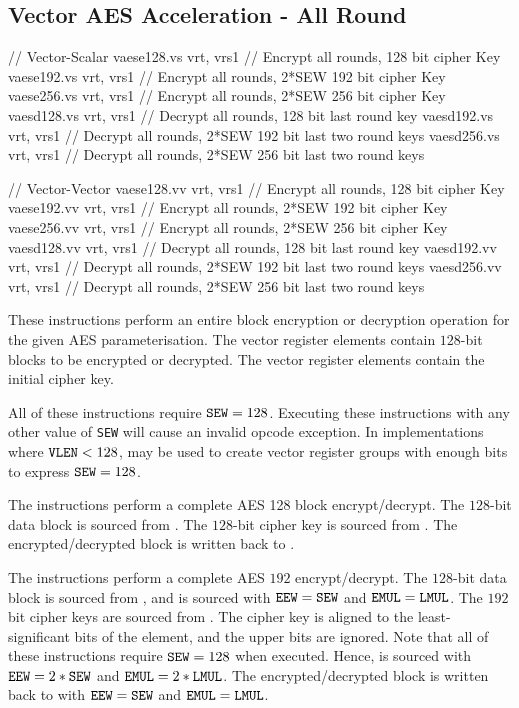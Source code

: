 \subsection{Vector AES Acceleration - All Round}
\label{sec:vector:aes:all-round}

\begin{cryptoisa}
// Vector-Scalar
vaese128.vs vrt, vrs1 // Encrypt all rounds,       128 bit cipher Key
vaese192.vs vrt, vrs1 // Encrypt all rounds, 2*SEW 192 bit cipher Key
vaese256.vs vrt, vrs1 // Encrypt all rounds, 2*SEW 256 bit cipher Key
vaesd128.vs vrt, vrs1 // Decrypt all rounds,       128 bit last     round key
vaesd192.vs vrt, vrs1 // Decrypt all rounds, 2*SEW 192 bit last two round keys
vaesd256.vs vrt, vrs1 // Decrypt all rounds, 2*SEW 256 bit last two round keys

// Vector-Vector
vaese128.vv vrt, vrs1 // Encrypt all rounds,       128 bit cipher Key
vaese192.vv vrt, vrs1 // Encrypt all rounds, 2*SEW 192 bit cipher Key
vaese256.vv vrt, vrs1 // Encrypt all rounds, 2*SEW 256 bit cipher Key
vaesd128.vv vrt, vrs1 // Decrypt all rounds,       128 bit last     round key
vaesd192.vv vrt, vrs1 // Decrypt all rounds, 2*SEW 192 bit last two round keys
vaesd256.vv vrt, vrs1 // Decrypt all rounds, 2*SEW 256 bit last two round keys
\end{cryptoisa}

These instructions perform an entire block encryption or decryption
operation for the given AES parameterisation.
The \vrt vector register elements contain $128$-bit blocks
to be encrypted or decrypted.
The  vector register elements contain the initial
cipher key.

All of these instructions require ${\tt SEW}=128$.
Executing these instructions with any other value of {\tt SEW} will cause
an invalid opcode exception.
In implementations where ${\tt VLEN}<128$, \LMUL may be used to create
vector register groups with enough bits to express ${\tt SEW}=128$.

The  instructions perform a complete AES
128 block encrypt/decrypt.
The $128$-bit data block is sourced from \vrt.
The $128$-bit cipher key is sourced from .
The encrypted/decrypted block is written back to \vrt.

The  instructions perform a complete
AES $192$ encrypt/decrypt.
The $128$-bit data block is sourced from \vrt, and is sourced with
${\tt EEW}={\tt SEW}$ and ${\tt EMUL}={\tt LMUL}$.
The $192$ bit cipher keys are sourced from .
The cipher key is aligned to the least-significant
bits of the element, and the upper bits are ignored.
Note that all of these instructions require ${\tt SEW}=128$ when executed.
Hence,  is sourced with ${\tt EEW}=2*{\tt SEW}$ and ${\tt EMUL}=2*{\tt LMUL}$.
The encrypted/decrypted block is written back to \vrt with
${\tt EEW}={\tt SEW}$ and ${\tt EMUL}={\tt LMUL}$.

